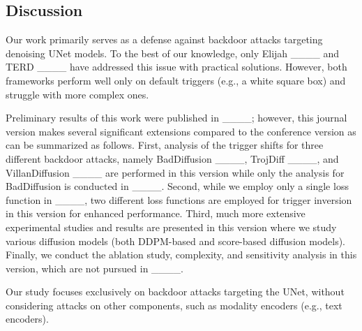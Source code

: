 \subsection{Discussion}
Our work primarily serves as a defense against backdoor attacks targeting denoising UNet models. To the best of our knowledge, only Elijah ____ and TERD ____ have addressed this issue with practical solutions. However, both frameworks perform well only on default triggers (e.g., a white square box) and struggle with more complex ones.

Preliminary results of this work were published in ____; however, this journal version makes several significant extensions compared to the conference version as can be summarized as follows. First, analysis of the trigger shifts  for three different backdoor attacks, namely BadDiffusion ____, TrojDiff ____, and VillanDiffusion ____ are performed in this version while only the analysis for BadDiffusion is conducted in ____. Second, while we employ only a single loss function in  ____, two different loss functions are employed for trigger inversion in this version for enhanced performance. Third, much more extensive experimental studies and results are presented in this version where we study various diffusion models (both DDPM-based and score-based diffusion models). %
Finally, we conduct the ablation study, complexity, and sensitivity analysis in this version, which are not pursued in ____.


Our study focuses exclusively on backdoor attacks targeting the UNet, without considering attacks on other components, such as modality encoders (e.g., text encoders).
